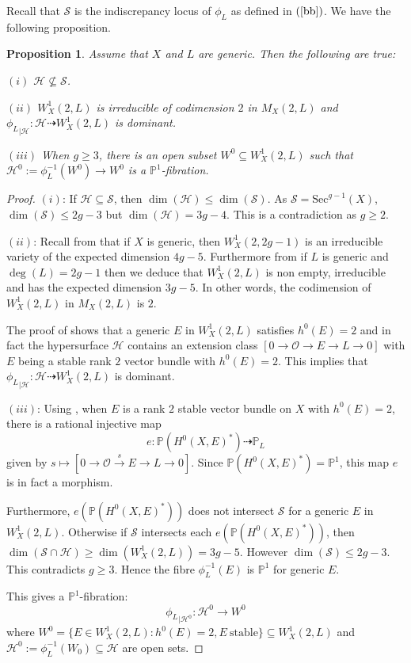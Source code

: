 \documentclass[12pt, reqno]{amsart}
\newtheorem{proposition}[theorem]{Proposition}
\newcommand{\Sec}{\textrm{Sec}}
\newcommand{\stable}{\textrm{stable}}
\begin{document}
Recall that $\mathcal{S}$ is the indiscrepancy locus of $\phi_{L}$ as defined in $(\ref{bb})$. We have the following proposition.
\begin{proposition}\label{35}
    Assume that $X$ and $L$ are generic. Then the following are true:
    
    $(i)$ $\mathcal{H}\nsubseteq \mathcal{S}$.

    $(ii)$ $W^{1}_{X}(2,L)$ is irreducible of codimension $2$ in $M_{X}(2,L)$ and ${\phi_{L}}_{|\mathcal{H}}:\mathcal{H}\dashrightarrow W^{1}_{X}(2,L)$ is dominant.

    $(iii)$ When $g\geq 3$, there is an open subset $W^{0}\subseteq W^{1}_{X}(2,L)$ such that $\mathcal{H}^{0}:=\phi_{L}^{-1}(W^{0})\rightarrow W^{0}$ is a $\mathbb{P}^{1}$-fibration.
\end{proposition}
\begin{proof}
$(i)$: If $\mathcal{H}\subseteq \mathcal{S}$, then $\dim(\mathcal{H})\leq \dim(\mathcal{S})$. As $\mathcal{S}=\Sec^{g-1}(X)$, $\dim(\mathcal{S})\leq 2g-3$ but $\dim(\mathcal{H})=3g-4$. This is a contradiction as $g\geq 2$.

$(ii)$: Recall from \cite[Theorem]{tb1} that if $X$ is generic, then $W^{1}_{X}(2,2g-1)$ is an irreducible variety of the expected dimension $4g-5$. Furthermore from \cite[Theorem $(1.1)$]{tb2} if $L$ is generic and $\deg(L)=2g-1$ then we deduce that $W^{1}_{X}(2,L)$ is non empty, irreducible and has the expected dimension $3g-5$. In other words, the codimension of $W^{1}_{X}(2,L)$ in $M_{X}(2,L)$ is $2$. 

The proof of  \cite[Theorem]{tb1} shows that a generic $E$ in $W^{1}_{X}(2,L)$ satisfies $h^{0}(E)=2$ and in fact the  hypersurface $\mathcal{H}$ contains an extension class $[0\rightarrow \mathcal{O}\rightarrow E\rightarrow L\rightarrow 0]$ with $E$ being a stable rank $2$ vector bundle with $h^{0}(E)=2$.   This implies that ${\phi_{L}}_{|\mathcal{H}}:\mathcal{H}\dashrightarrow W^{1}_{X}(2,L)$ is dominant.

 $(iii)$: Using \cite[Lemma $(4.1)$]{b}, when $E$ is a rank $2$ stable vector bundle on $X$ with $h^{0}(E)=2$, there is a rational injective map 
\[e:\mathbb{P}(H^{0}(X,E)^{*})\dashrightarrow \mathbb{P}_{L}\]
given by $s\mapsto [0\rightarrow \mathcal{O}\stackrel{s}{\rightarrow} E\rightarrow L\rightarrow 0]$. Since $\mathbb{P}(H^{0}(X,E)^{*})=\mathbb{P}^{1}$, this map $e$ is in fact a morphism. 

Furthermore, $e(\mathbb{P}(H^{0}(X,E)^{*}))$ does not intersect $\mathcal{S}$ for a generic $E$ in $W^{1}_{X}(2,L)$. Otherwise if $\mathcal{S}$ intersects each $e(\mathbb{P}(H^{0}(X,E)^{*}))$, then $\dim(\mathcal{S}\cap \mathcal{H}) \geq \dim(W^{1}_{X}(2,L))=3g-5$. However $\dim(\mathcal{S})\leq 2g-3$. This contradicts $g\geq 3$. Hence the fibre $\phi_{L}^{-1}(E)$ is $\mathbb{P}^{1}$ for generic $E$.

This gives a $\mathbb{P}^{1}$-fibration:\[{\phi_{L}}_{|\mathcal{H}^{0}}:\mathcal{H}^{0}\rightarrow W^{0}\]
where $W^{0}=\{E\in W^{1}_{X}(2,L):h^{0}(E)=2, E ~\stable \}\subseteq W^{1}_{X}(2,L)$ and $\mathcal{H}^{0}:=\phi_{L}^{-1}(W_{0})\subseteq \mathcal{H}$ are open sets. 
\end{proof}
\end{document}
